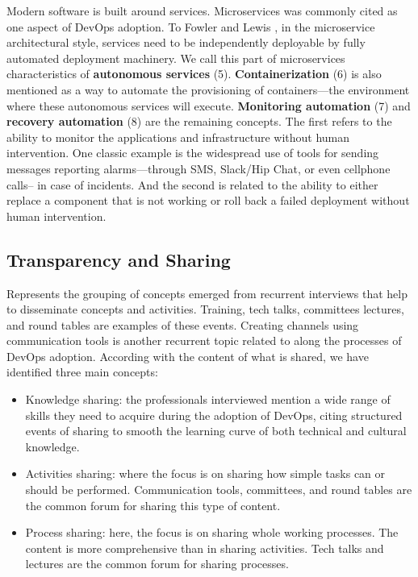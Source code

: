 Modern software is built around services. Microservices  was commonly cited
as one aspect of DevOps adoption. To Fowler and Lewis
\cite{martinfowler2014microservices}, in the
microservice architectural style, services need to be independently deployable
by fully automated deployment machinery. We call this part of microservices
characteristics of \textbf{autonomous services} (5). \textbf{Containerization}
(6) is also mentioned as a way to automate the provisioning of containers---the
environment where these autonomous services will execute.
\textbf{Monitoring automation} (7) and \textbf{recovery automation} (8) are the
remaining concepts. The first refers to the ability to monitor the
applications and infrastructure without human intervention. One classic example
is the widespread use of tools for sending messages reporting
alarms---through SMS, Slack/Hip Chat, or even
cellphone calls-- in case of incidents. And the second is related to the ability
to either replace a component that is not working or
roll back a failed deployment without human intervention.

\subsection{Transparency and Sharing} Represents the grouping of concepts
emerged from recurrent interviews that help to disseminate concepts and
activities. Training, tech talks, committees lectures, and round tables
are examples of these events. Creating
channels using communication tools is another recurrent topic
related to  along the processes of DevOps adoption.
According with the content of what is shared, we
have identified three main concepts:

\begin{itemize}
\item Knowledge sharing: the professionals interviewed mention a wide range of
skills they need to acquire during the adoption of DevOps, citing
structured events of sharing to smooth the learning curve of both technical and
cultural knowledge.


\item Activities sharing: where the focus is on sharing how simple tasks can or
should be performed. Communication tools, committees, and round tables are the common
forum for sharing this type of content.

\item Process sharing: here, the focus is on sharing whole working processes. The
content is more comprehensive than in sharing activities. Tech talks and
lectures are the common forum for sharing processes.

\end{itemize}

